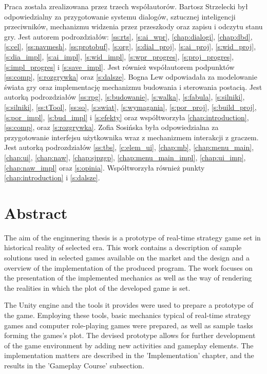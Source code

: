 Praca została zrealizowana przez trzech współautorów. Bartosz Strzelecki był odpowiedzialny za przygotowanie systemu
dialogów, sztucznej inteligencji przeciwników, mechanizmu widzenia przez przeszkody oraz zapisu i odczytu stanu gry.
Jest autorem podrozdziałów: \ref{ss:rts},
\ref{s:ai_wpr}, \ref{chap:dialogi}, \ref{chap:dbd}, \ref{s:cel}, \ref{ss:navmesh}, \ref{ss:protobuf}, \ref{s:org},
\ref{s:dial_proj}, \ref{s:ai_proj}, \ref{s:wid_proj}, \ref{s:dia_impl}, \ref{s:ai_impl}, \ref{s:wid_impl}, \ref{s:wpr_progres}, \ref{s:proj_progres}, \ref{s:impl_progres} i
\ref{s:save_impl}. Jest również współautorem podpunktów \ref{ss:comp}, \ref{s:rozgrywka} oraz \ref{s:dalsze}.
Bogna Lew odpowiadała za modelowanie świata gry oraz implementację mechanizmu budowania i sterowania postacią. Jest autorką
podrozdziałów \ref{ss:rpg}, \ref{s:budowanie}, \ref{s:walka}, \ref{s:fabula}, \ref{s:silniki}, \ref{s:silniki},
\ref{ss:tTool}, \ref{ss:so}, \ref{s:swiat}, \ref{s:wymagania}, \ref{s:por_proj}, \ref{s:build_proj}, \ref{s:por_impl}, \ref{s:bud_impl} i
\ref{s:efekty} oraz współtworzyła \ref{chap:introduction}, \ref{ss:comp}, oraz \ref{s:rozgrywka}.
Zofia Sosińska była odpowiedzialna za przygotowanie interfejsu użytkownika wraz z mechanizmem interakcji z graczem. Jest
autorką podrozdziałów \ref{ss:tbs}, \ref{c:elem_ui}, \ref{chap:mb},
\ref{chap:menu_main}, \ref{chap:ui}, \ref{chap:naw}, \ref{chap:sjpzgp}, \ref{chap:menu_main_impl}, \ref{chap:ui_imp},
\ref{chap:naw_impl} oraz \ref{s:opinia}. Współtworzyła również punkty \ref{chap:introduction} i \ref{s:dalsze}.

\chapter*{Abstract}
The aim of the enginnering thesis is a prototype of real-time strategy game set in historical reality of selected era.
This work contains a description of sample solutions used in selected games available on the market
and the design and a overview of the implementation of the produced program. The work focuses on the presentation 
of the implemented mechanics as well as
the way of rendering the realities in which the plot of the developed game is set.

The Unity engine and the tools it provides were used to prepare a prototype of the game.
Employing these tools, basic mechanics typical of real-time strategy games and computer role-playing games were prepared,
as well as sample tasks forming the games's plot. The devised prototype allows for 
further development of the game environment by adding new activities and gameplay elements.
The implementation matters are described in the 'Implementation' chapter, and the results in the 'Gameplay Course' subsection.

